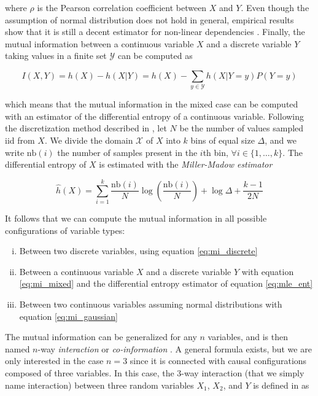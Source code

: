 where $\rho$ is the Pearson correlation coefficient between $X$ and $Y$. Even
though the assumption of normal distribution does not hold in general, empirical
results show that it is still a decent estimator for non-linear dependencies
\parencite{olsen2008impact}. Finally, the mutual information between a continuous
variable $X$ and a discrete variable $Y$ taking values in a finite set $\mathcal
Y$ can be computed as

\begin{equation}
I(X, Y)=h(X) - h(X|Y)=h(X)-\sum_{y\in\mathcal Y}h(X|Y=y)P(Y=y)\label{eq:mi_mixed}
\end{equation}

which means that the mutual information in the mixed case can be computed with
an estimator of the differential entropy of a continuous variable. Following the
discretization method described in \parencite{olsen2008impact}, let $N$ be the
number of values sampled iid from $X$. We divide the domain $\mathcal X$ of $X$
into $k$ bins of equal size $\Delta$, and we write $\text{nb}(i)$ the number of
samples present in the $i$th bin, $\forall i\in\{1,\dots,k\}$. The differential
entropy of $X$ is estimated with the \emph{Miller-Madow estimator}

\begin{equation}
    \label{eq:mle_ent}
    \hat h(X) = \sum_{i=1}^k
    \frac{\text{nb}(i)}{N}\log\left(\frac{\text{nb}(i)}{N}\right) + \log\Delta +
    \frac{k-1}{2N}
\end{equation}

It follows that we can compute the mutual information in all possible
configurations of variable types:
\begin{enumerate}[(i)]
    \item Between two discrete variables, using equation \ref{eq:mi_discrete}
    \item Between a continuous variable $X$ and a discrete variable $Y$ with
    equation \ref{eq:mi_mixed} and the differential entropy estimator of
    equation \ref{eq:mle_ent}
    \item Between two continuous variables assuming normal distributions with
    equation \ref{eq:mi_gaussian}
\end{enumerate}

The mutual information can be generalized for any $n$ variables, and is then
named $n$-way \emph{interaction} or \emph{co-information}
\parencite{bell2003co}. A general formula exists, but we are only interested in
the case $n=3$ since it is connected with causal configurations composed of
three variables. In this case, the 3-way interaction (that we simply name
interaction) between three random variables $X_1$, $X_2$, and $Y$ is defined in
\parencite{mcgill1954multivariate} as


